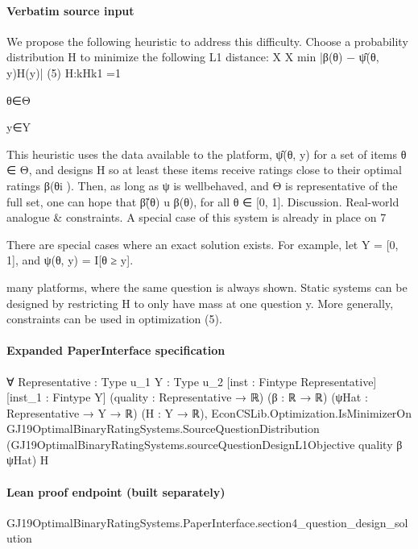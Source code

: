 \documentclass[10pt]{article}
\begin{document}
\paragraph{Verbatim source input}
\begin{ReviewVerbatim}
We propose the following heuristic to address this
difficulty. Choose a probability distribution H to
minimize the following L1 distance:
X
X
min
|β(θ) −
ψ̂(θ, y)H(y)|
(5)
H:kHk1 =1

θ∈Θ

y∈Y

This heuristic uses the data available to the platform, ψ̂(θ, y) for a set of items θ ∈ Θ, and designs H
so at least these items receive ratings close to their
optimal ratings β(θi ). Then, as long as ψ is wellbehaved, and Θ is representative of the full set, one
can hope that β̃(θ) u β(θ), for all θ ∈ [0, 1].
Discussion. Real-world analogue & constraints. A
special case of this system is already in place on
7

There are special cases where an exact solution exists. For example, let Y = [0, 1], and ψ(θ, y) = I[θ ≥ y].

many platforms, where the same question is always
shown. Static systems can be designed by restricting
H to only have mass at one question y. More generally, constraints can be used in optimization (5).
\end{ReviewVerbatim}


\paragraph{Expanded PaperInterface specification}
\begin{ReviewVerbatim}
∀ {Representative : Type u_1} {Y : Type u_2} [inst : Fintype Representative] [inst_1 : Fintype Y]
  (quality : Representative → ℝ) (β : ℝ → ℝ) (ψHat : Representative → Y → ℝ) (H : Y → ℝ),
  EconCSLib.Optimization.IsMinimizerOn GJ19OptimalBinaryRatingSystems.SourceQuestionDistribution
    (GJ19OptimalBinaryRatingSystems.sourceQuestionDesignL1Objective quality β ψHat) H
\end{ReviewVerbatim}

\paragraph{Lean proof endpoint (built separately)}\begin{ReviewVerbatim}
GJ19OptimalBinaryRatingSystems.PaperInterface.section4_question_design_solution
\end{ReviewVerbatim}
\end{document}
